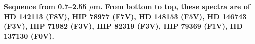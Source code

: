 {\bf Sequence from 0.7–2.55 $\mu$m. From bottom to top, these spectra are of HD 142113 (F8V), HIP 78977 (F7V), HD 148153 (F5V), HD 146743 (F3V), HIP 71982 (F3V), HIP 82319 (F3V), HIP 79369 (F1V), HD 137130 (F0V).
\label{fig:stack-plot-f}}
